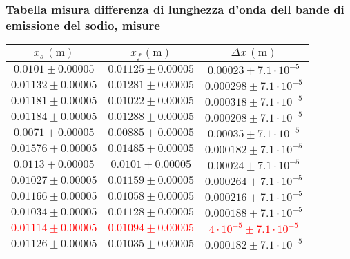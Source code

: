 \subsubsection{Tabella misura differenza di lunghezza d'onda dell bande di emissione del sodio, misure}
    \begin{table}[H]
    \centering
        \begin{tabular}{|c|c|c|}
        \hline
        $ x_s \, (\text{m}) $ & $ x_f \, (\text{m}) $ & $ \Delta x \, (\text{m}) $ \\
        \hline
        $0{.}0101 \pm 0{.}00005$ & $0{.}01125 \pm 0{.}00005$ & $0{.}00023 \pm 7{.}1 \cdot 10^{-5}$ \\
        \hline
        $0{.}01132 \pm 0{.}00005$ & $0{.}01281 \pm 0{.}00005$ & $0{.}000298 \pm 7{.}1 \cdot 10^{-5}$ \\
        \hline
        $0{.}01181 \pm 0{.}00005$ & $0{.}01022 \pm 0{.}00005$ & $0{.}000318 \pm 7{.}1 \cdot 10^{-5}$ \\
        \hline
        $0{.}01184 \pm 0{.}00005$ & $0{.}01288 \pm 0{.}00005$ & $0{.}000208 \pm 7{.}1 \cdot 10^{-5}$ \\
        \hline
        $0{.}0071 \pm 0{.}00005$ & $0{.}00885 \pm 0{.}00005$ & $0{.}00035 \pm 7{.}1 \cdot 10^{-5}$ \\
        \hline
        $0{.}01576 \pm 0{.}00005$ & $0{.}01485 \pm 0{.}00005$ & $0{.}000182 \pm 7{.}1 \cdot 10^{-5}$ \\
        \hline
        $0{.}0113 \pm 0{.}00005$ & $0{.}0101 \pm 0{.}00005$ & $0{.}00024 \pm 7{.}1 \cdot 10^{-5}$ \\
        \hline
        $0{.}01027 \pm 0{.}00005$ & $0{.}01159 \pm 0{.}00005$ & $0{.}000264 \pm 7{.}1 \cdot 10^{-5}$ \\
        \hline
        $0{.}01166 \pm 0{.}00005$ & $0{.}01058 \pm 0{.}00005$ & $0{.}000216 \pm 7{.}1 \cdot 10^{-5}$ \\
        \hline
        $0{.}01034 \pm 0{.}00005$ & $0{.}01128 \pm 0{.}00005$ & $0{.}000188 \pm 7{.}1 \cdot 10^{-5}$ \\
        \hline
        \textcolor{red}{$0{.}01114 \pm 0{.}00005$} & \textcolor{red}{$0{.}01094 \pm 0{.}00005$} & \textcolor{red}{$4 \cdot 10^{-5} \pm 7{.}1 \cdot 10^{-5}$} \\
        \hline
        $0{.}01126 \pm 0{.}00005$ & $0{.}01035 \pm 0{.}00005$ & $0{.}000182 \pm 7{.}1 \cdot 10^{-5}$ \\
        \hline
        \end{tabular}
    \end{table}